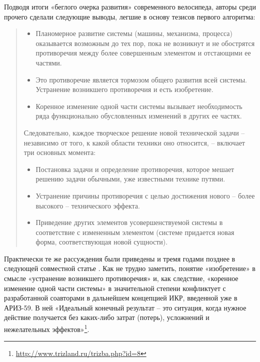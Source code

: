 \documentclass[11pt,a4paper]{article}
\begin{document}
Подводя итоги «беглого очерка развития» современного велосипеда, авторы среди
прочего сделали следующие выводы, легшие в основу тезисов первого алгоритма:
\begin{quote}
  \begin{itemize}
  \item[3.] Планомерное развитие системы (машины, механизма, процесса)
    оказывается возможным до тех пор, пока не возникнут и не обострятся
    противоречия между более совершенным элементом и отстающими ее частями.
  \item[4.] Это противоречие является тормозом общего развития всей системы.
    Устранение возникшего противоречия и есть изобретение.
  \item[5.] Коренное изменение одной части системы вызывает необходимость ряда
    функционально обусловленных изменений в других ее частях.
  \end{itemize}
  Следовательно, каждое творческое решение новой технической задачи --
  независимо от того, к какой области техники оно относится, -- включает три
  основных момента:
  \begin{itemize}
  \item[1.] Постановка задачи и определение противоречия, которое мешает
    решению задачи обычными, уже известными технике путями.
  \item[2.] Устранение причины противоречия с целью достижения нового -- более
    высокого -- технического эффекта.
  \item[3.] Приведение других элементов усовершенствуемой системы в
    соответствие с измененным элементом (системе придается новая форма,
    соответствующая новой сущности).
  \end{itemize}
\end{quote}

Практически те же рассуждения были приведены и тремя годами позднее в
следующей совместной статье \cite{Altshuller1959}. Как не трудно заметить,
понятие «изобретение» в смысле «устранение возникшего противоречия» и, как
следствие, «коренное изменение одной части системы» в значительной степени
конфликтует с разработанной соавторами в дальнейшем концепцией ИКР, введенной
уже в АРИЗ-59.  В ней «Идеальный конечный результат -- это ситуация, когда
нужное действие получается без каких-либо затрат (потерь), усложнений и
нежелательных
эффектов»\footnote{\url{http://www.trizland.ru/trizba.php?id=8}}.
\end{document}

